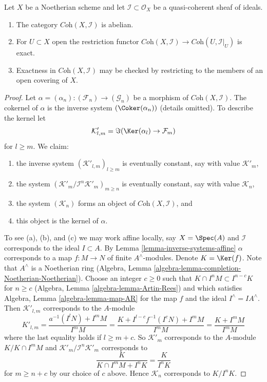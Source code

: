 \begin{lemma}
\label{lemma-inverse-systems-abelian}
Let $X$ be a Noetherian scheme and let $\mathcal{I} \subset \mathcal{O}_X$
be a quasi-coherent sheaf of ideals.
\begin{enumerate}
\item The category $\textit{Coh}(X, \mathcal{I})$ is abelian.
\item For $U \subset X$ open the restriction functor
$\textit{Coh}(X, \mathcal{I}) \to \textit{Coh}(U, \mathcal{I}|_U)$
is exact.
\item Exactness in $\textit{Coh}(X, \mathcal{I})$ may be checked by
restricting to the members of an open covering of $X$.
\end{enumerate}
\end{lemma}

\begin{proof}
Let $\alpha =(\alpha_n) : (\mathcal{F}_n) \to (\mathcal{G}_n)$ be a morphism of
$\textit{Coh}(X, \mathcal{I})$. The cokernel of $\alpha$ is the inverse system
$(\Coker(\alpha_n))$ (details omitted). To describe the kernel let
$$
\mathcal{K}'_{l, m} = \Im(\Ker(\alpha_l) \to \mathcal{F}_m)
$$
for $l \geq m$.
We claim:
\begin{enumerate}
\item[(a)] the inverse system $(\mathcal{K}'_{l, m})_{l \geq m}$ is
eventually constant, say with value $\mathcal{K}'_m$,
\item[(b)] the system $(\mathcal{K}'_m/\mathcal{I}^n\mathcal{K}'_m)_{m \geq n}$
is eventually constant, say with value $\mathcal{K}_n$,
\item[(c)] the system $(\mathcal{K}_n)$ forms an object of
$\textit{Coh}(X, \mathcal{I})$, and
\item[(d)] this object is the kernel of $\alpha$.
\end{enumerate}
To see (a), (b), and (c) we may work affine locally, say $X = \Spec(A)$
and $\mathcal{I}$ corresponds to the ideal $I \subset A$. By
Lemma \ref{lemma-inverse-systems-affine}
$\alpha$ corresponds to a map $f : M \to N$ of finite $A^\wedge$-modules.
Denote $K = \Ker(f)$. Note that $A^\wedge$ is a Noetherian
ring (Algebra, Lemma \ref{algebra-lemma-completion-Noetherian-Noetherian}).
Choose an integer $c \geq 0$ such that
$K \cap I^n M \subset I^{n - c}K$ for $n \geq c$
(Algebra, Lemma \ref{algebra-lemma-Artin-Rees})
and which satisfies Algebra, Lemma \ref{algebra-lemma-map-AR}
for the map $f$ and the ideal $I^\wedge = IA^\wedge$. Then
$\mathcal{K}'_{l, m}$ corresponds to the $A$-module
$$
K'_{l, m} = \frac{a^{-1}(I^lN) + I^mM}{I^mM} =
\frac{K + I^{l - c}f^{-1}(I^cN) + I^mM}{I^mM} =
\frac{K + I^mM}{I^mM}
$$
where the last equality holds if $l \geq m + c$. So $\mathcal{K}'_m$
corresponds to the $A$-module $K/K \cap I^mM$ and
$\mathcal{K}'_m/\mathcal{I}^n\mathcal{K}'_m$ corresponds to
$$
\frac{K}{K \cap I^mM + I^nK} = \frac{K}{I^nK}
$$
for $m \geq n + c$ by our choice of $c$ above. Hence $\mathcal{K}_n$
corresponds to $K/I^nK$.


\end{proof}
